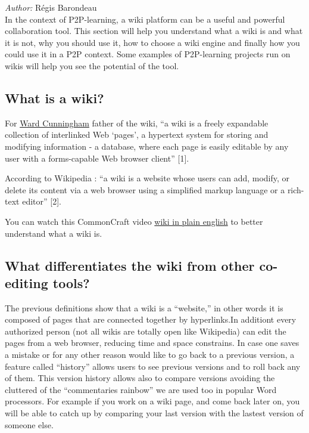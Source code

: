 \emph{Author:} Régis Barondeau \\

In the context of P2P-learning, a wiki platform can be a useful and
powerful collaboration tool. This section will help you understand what
a wiki is and what it is not, why you should use it, how to choose a
wiki engine and finally how you could use it in a P2P context. Some
examples of P2P-learning projects run on wikis will help you see the
potential of the tool.

\subsection{What is a wiki?}

For \href{http://en.wikipedia.org/wiki/Ward\_cunningham}{Ward
Cunningham} father of the wiki, ``a wiki is a freely expandable
collection of interlinked Web `pages', a hypertext system for storing
and modifying information - a database, where each page is easily
editable by any user with a forms-capable Web browser client'' {[}1{]}.

According to Wikipedia : ``a wiki is a website whose users can add,
modify, or delete its content via a web browser using a simplified
markup language or a rich-text editor'' {[}2{]}.

You can watch this CommonCraft video
\href{http://www.youtube.com/watch?v=-dnL00TdmLY}{wiki in plain english}
to better understand what a wiki is.

\subsection{What differentiates the wiki from other co-editing tools?}

The previous definitions show that a wiki is a ``website,'' in other
words it is composed of pages that are connected together by
hyperlinks.In additiont every authorized person (not all wikis are
totally open like Wikipedia) can edit the pages from a web browser,
reducing time and space constrains. In case one saves a mistake or for
any other reason would like to go back to a previous version, a feature
called ``history'' allows users to see previous versions and to roll
back any of them. This version history allows also to compare versions
avoiding the cluttered of the ``commentaries rainbow'' we are used too
in popular Word processors. For example if you work on a wiki page, and
come back later on, you will be able to catch up by comparing your last
version with the lastest version of someone else.

